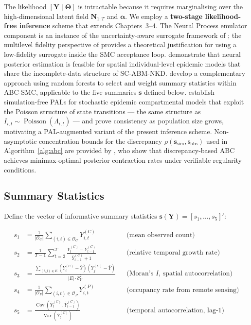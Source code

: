 \documentclass[12pt,a4paper]{article}
\theoremstyle{definition}
\newcommand{\Var}{\operatorname{Var}}
\newcommand{\Cov}{\operatorname{Cov}}
\newcommand{\Pois}{\operatorname{Poisson}}
\newcommand{\bs}{\bm{s}}
\newcommand{\balpha}{\bm{\alpha}}
\newcommand{\bTheta}{\bm{\Theta}}
\newcommand{\OC}{\mathcal{O}_C}
\newcommand{\OP}{\mathcal{O}_P}
\begin{document}
The likelihood $[\mathbf{Y}\mid\bTheta]$ is intractable because it requires
marginalising over the high-dimensional latent field $\mathbf{N}_{1:T}$ and
$\balpha$.  We employ a \textbf{two-stage likelihood-free inference} scheme
that extends \citet{heard2014} Chapters~3--4.
The Neural Process emulator component \citep{garnelo2018} is an instance of
the uncertainty-aware surrogate framework of \citet{scheurer2025};
the multilevel fidelity perspective of \citet{hikida2025} provides a
theoretical justification for using a low-fidelity surrogate inside the
SMC acceptance loop.
\citet{mao2026} demonstrate that neural posterior estimation is feasible
for spatial individual-level epidemic models that share the incomplete-data
structure of SC-ABM-NKD.
\citet{dinh2025} develop a complementary approach using random forests
to select and weight summary statistics within ABC-SMC, applicable
to the five summaries $\bs$ defined below.
\citet{whitehouse2023} establish simulation-free PALs for stochastic epidemic
compartmental models that exploit the Poisson structure of state transitions
--- the same structure as $I_{i,t} \sim \Pois(\Lambda_{i,t})$ --- and prove
consistency as population size grows, motivating a PAL-augmented variant of
the present inference scheme.
Non-asymptotic concentration bounds for the discrepancy $\rho(\bs_{\mathrm{sim}},
\bs_{\mathrm{obs}})$ used in Algorithm~\ref{alg:abc} are provided by
\citet{legramanti2025}, who show that discrepancy-based ABC achieves
minimax-optimal posterior contraction rates under verifiable regularity conditions.

\subsection{Summary Statistics}

Define the vector of informative summary statistics
$\bs(\mathbf{Y}) = [s_1,\ldots,s_5]'$:

\begin{align}
  s_1 &= \frac{1}{|\OC|} \sum_{(i,t)\in\OC} Y_{i,t}^{(C)}
    & &\text{(mean observed count)}
    \label{eq:s1} \\[4pt]
  s_2 &= \frac{1}{T-1} \sum_{t=2}^{T}
    \frac{\bar{Y}_t^{(C)} - \bar{Y}_{t-1}^{(C)}}{\bar{Y}_{t-1}^{(C)} + 1}
    & &\text{(relative temporal growth rate)}
    \label{eq:s2} \\[4pt]
  s_3 &= \frac{\displaystyle\sum_{(i,j)\in E}
    (Y_i^{(C)}-\bar{Y})(Y_j^{(C)}-\bar{Y})}
    {|E|\cdot\hat{\sigma}^2_Y}
    & &\text{(Moran's }I\text{, spatial autocorrelation)}
    \label{eq:s3} \\[4pt]
  s_4 &= \frac{1}{|\OP|}\sum_{(i,t)\in\OP} Y_{i,t}^{(P)}
    & &\text{(occupancy rate from remote sensing)}
    \label{eq:s4} \\[4pt]
  s_5 &= \frac{\Cov\!\left(\bar{Y}_t^{(C)},\, \bar{Y}_{t-1}^{(C)}\right)}
    {\Var\!\left(\bar{Y}_t^{(C)}\right)}
    & &\text{(temporal autocorrelation, lag-1)}
    \label{eq:s5}
\end{align}
\end{document}
